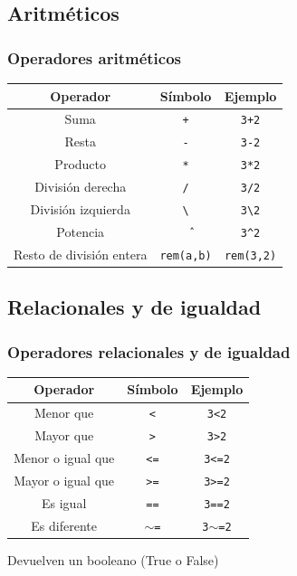 \subsection{Aritméticos}
\begin{frame}[label=oper_aritmeticos]
 \frametitle{Operadores aritméticos}
 \begin{center}
 \begin{small}
  \begin{tabular}{|c|c|c|}
  \multicolumn{1}{c}{Operador} & \multicolumn{1}{c}{Símbolo} &
       \multicolumn{1}{c}{Ejemplo} \\ \toprule \hline
  Suma & \texttt{+} & \texttt{3+2} \\ \hline
  Resta & \texttt{-} & \texttt{3-2} \\ \hline
  Producto & \texttt{*} & \texttt{3*2} \\ \hline
  División derecha & \texttt{/} & \texttt{3/2} \\ \hline
  División izquierda & \texttt{\textbackslash} & \texttt{3\textbackslash 2} \\
\hline
  Potencia & \texttt{\^\ } & \texttt{3\^{}2} \\ \hline
  Resto de división entera & \texttt{rem(a,b)} & \texttt{rem(3,2)} \\
\hline
  \end{tabular}
 \end{small}
 \end{center}
\end{frame}
\subsection{Relacionales y de igualdad}
\begin{frame}[label=oper_relacionales]
 \frametitle{Operadores relacionales y de igualdad}
 \begin{center}
 \begin{small}
  \begin{tabular}{|c|c|c|}
  \multicolumn{1}{c}{Operador} & \multicolumn{1}{c}{Símbolo} &
       \multicolumn{1}{c}{Ejemplo} \\ \toprule \hline
  Menor que & \texttt{<} & \texttt{3<2} \\ \hline
  Mayor que & \texttt{>} & \texttt{3>2} \\ \hline
  Menor o igual que & \texttt{<=} & \texttt{3<=2} \\ \hline
  Mayor o igual que & \texttt{>=} & \texttt{3>=2} \\ \hline
  Es igual & \texttt{==} & \texttt{3==2} \\
\hline
  Es diferente & \texttt{$\sim$=} & \texttt{3$\sim$=2} \\ \hline 
  \end{tabular}
 \end{small}
 \end{center}
 Devuelven un \alert{booleano} (True o False)
\end{frame}

